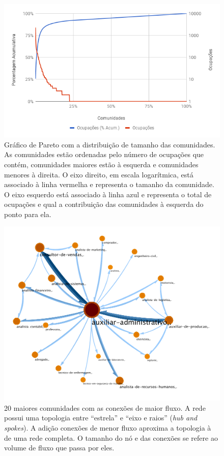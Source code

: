 \documentclass[
  article,
  11pt,
  a4paper,
  english,
  brazil,
  sumario=tradicional]{abntex2}
\begin{document}
\begin{figure}[htb]
  \centering
  \includegraphics[width=0.9\linewidth]{pareto-comunidades.png}
  \caption{Gráfico de Pareto com a distribuição de tamanho das comunidades. As comunidades estão ordenadas pelo número de ocupações que contém, comunidades maiores estão à esquerda e comunidades menores à direita. O eixo direito, em escala logarítmica, está associado à linha vermelha e representa o tamanho da comunidade. O eixo esquerdo está associado à linha azul e representa o total de ocupações e qual a contribuição das comunidades à esquerda do ponto para ela.}
  \label{fig:pareto-comunidades}
\end{figure}


\begin{figure}[ht]
  \centering
  \includegraphics[width=0.9\linewidth]{ex-sobreposicao.pdf}
  \caption{20 maiores comunidades com as conexões de maior fluxo. A rede possui uma topologia entre \enquote{estrela} e \enquote{eixo e raios} (\textit{hub and spokes}). A adição conexões de menor fluxo aproxima a topologia à de uma rede completa.  O tamanho do nó e das conexões se refere ao volume de fluxo que passa por eles.}
  \label{fig:ex-sobreposicao}
\end{figure}
\end{document}
